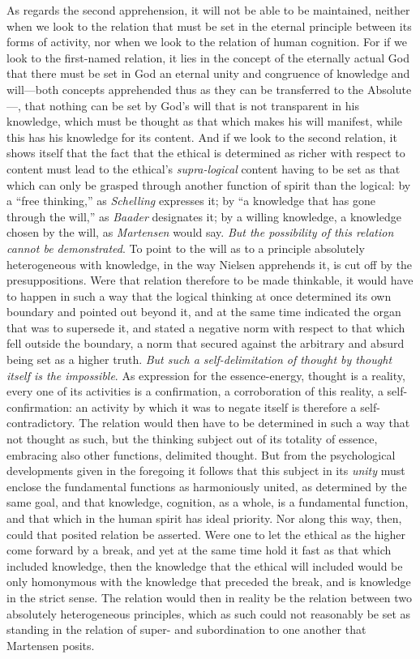 \documentclass[12pt,a4paper]{book}
\begin{document}
As regards the second apprehension, it will not be able to be maintained, neither
when we look to the relation that must be set in the eternal principle between its
forms of activity, nor when we look to the relation of human cognition. For if we
look to the first-named relation, it lies in the concept of the eternally actual God
that there must be set in God an eternal unity and congruence of knowledge and
will---both concepts apprehended thus as they can be transferred to the
Absolute---, that nothing can be set by God's will that is not transparent in his
knowledge, which must be thought as that which makes his will manifest, while this
has his knowledge for its content. And if we look to the second relation, it shows
itself that the fact that the ethical is determined as richer with respect to
content must lead to the ethical's \emph{supra-logical} content having to be set as that
which can only be grasped through another function of spirit than the logical: by a
``free thinking,'' as \emph{Schelling} expresses it; by ``a knowledge that has gone through
the will,'' as \emph{Baader} designates it; by a willing knowledge, a knowledge chosen by
the will, as \emph{Martensen} would say. \emph{But the possibility of this relation cannot be
demonstrated}. To point to the will as to a principle absolutely heterogeneous with
knowledge, in the way Nielsen apprehends it, is cut off by the presuppositions. Were
that relation therefore to be made thinkable, it would have to happen in such a way
that the logical thinking at once determined its own boundary and pointed out beyond
it, and at the same time indicated the organ that was to supersede it, and stated a
negative norm with respect to that which fell outside the boundary, a norm that
secured against the arbitrary and absurd being set as a higher truth. \emph{But such a
self-delimitation of thought by thought itself is the impossible}. As expression for
the essence-energy, thought is a reality, every one of its activities is a
confirmation, a corroboration of this reality, a self-confirmation: an activity by
which it was to negate itself is therefore a self-contradictory. The relation would
then have to be determined in such a way that not thought as such, but the thinking
subject out of its totality of essence, embracing also other functions, delimited
thought. But from the psychological developments given in the foregoing it follows
that this subject in its \emph{unity} must enclose the fundamental functions as harmoniously
united, as determined by the same goal, and that knowledge, cognition, as a whole, is
a fundamental function, and that which in the human spirit has ideal priority. Nor
along this way, then, could that posited relation be asserted. Were one to let the
ethical as the higher come forward by a break, and yet at the same time hold it fast
as that which included knowledge, then the knowledge that the ethical will included
would be only homonymous with the knowledge that preceded the break, and is knowledge
in the strict sense. The relation would then in reality be the relation between two
absolutely heterogeneous principles, which as such could not reasonably be set as
standing in the relation of super- and subordination to one another that Martensen
posits.
\end{document}

